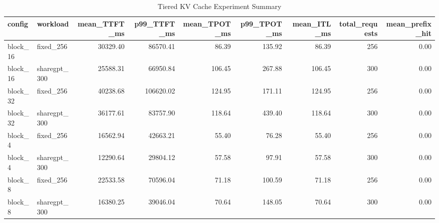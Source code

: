 \begin{table}
\caption{Tiered KV Cache Experiment Summary}
\label{tab:tiered_kv_summary}
\begin{tabular}{llrrrrrrr}
\toprule
config & workload & mean_TTFT_ms & p99_TTFT_ms & mean_TPOT_ms & p99_TPOT_ms & mean_ITL_ms & total_requests & mean_prefix_hit \\
\midrule
block_16 & fixed_256 & 30329.40 & 86570.41 & 86.39 & 135.92 & 86.39 & 256 & 0.00 \\
block_16 & sharegpt_300 & 25588.31 & 66950.84 & 106.45 & 267.88 & 106.45 & 300 & 0.00 \\
block_32 & fixed_256 & 40238.68 & 106620.02 & 124.95 & 171.11 & 124.95 & 256 & 0.00 \\
block_32 & sharegpt_300 & 36177.61 & 83757.90 & 118.64 & 439.40 & 118.64 & 300 & 0.00 \\
block_4 & fixed_256 & 16562.94 & 42663.21 & 55.40 & 76.28 & 55.40 & 256 & 0.00 \\
block_4 & sharegpt_300 & 12290.64 & 29804.12 & 57.58 & 97.91 & 57.58 & 300 & 0.00 \\
block_8 & fixed_256 & 22533.58 & 70596.04 & 71.18 & 100.59 & 71.18 & 256 & 0.00 \\
block_8 & sharegpt_300 & 16380.25 & 39046.04 & 70.64 & 148.05 & 70.64 & 300 & 0.00 \\
\bottomrule
\end{tabular}
\end{table}
